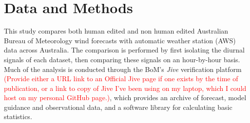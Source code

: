 \documentclass{ametsoc}
\begin{document}
\section{Data and Methods} \label{Sec:Methods}
This study compares both human edited and non human edited Australian Bureau of Meteorology wind forecasts with automatic weather station (AWS) data across Australia. The comparison is performed by first isolating the diurnal signals of each dataset, then comparing these signals on an hour-by-hour basis. Much of the analysis is conducted through the BoM's \textit{Jive} verification platform \textcolor{red}{(Provide either a URL link to an Official Jive page if one exists by the time of publication, or a link to copy of Jive I've been using on my laptop, which I could host on my personal GitHub page.)}, which provides an archive of forecast, model guidance and observational data, and a software library for calculating basic statistics.  
\end{document}
